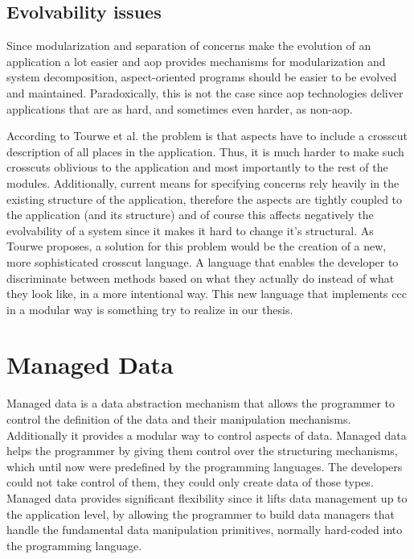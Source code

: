 \subsection{Evolvability issues}\label{Aspect Oriented Programming Evolvability}
Since modularization and separation of concerns make the evolution of an application a lot easier and \ac{aop} provides mechanisms for modularization and system decomposition, aspect-oriented programs should be easier to be evolved and maintained.
Paradoxically, this is not the case \cite{tourwe2003existence} since \ac{aop} technologies deliver applications that are as hard, and sometimes even harder, as non-\ac{aop}.

According to Tourwe et al. \cite{tourwe2003existence} the problem is that aspects have to include a crosscut description of all places in the application.
Thus, it is much harder to make such crosscuts oblivious to the application and most importantly to the rest of the modules. 
Additionally, current means for specifying concerns rely heavily in the existing structure of the application, therefore the aspects are tightly coupled to the application (and its structure) and of course this affects negatively the evolvability of a system since it makes it hard to change it's structural.
As Tourwe \cite{tourwe2003existence} proposes, a solution for this problem would be the creation of a new, more sophisticated crosscut language. 
A language that enables the developer to discriminate between methods based on what they actually do instead of what they look like, in a more intentional way.
This new language that implements \ac{ccc} in a modular way is something try to realize in our thesis.

\section{Managed Data}\label{Managed Data}
Managed data \cite{loh2012managed} is a data abstraction mechanism that allows the programmer to control the definition of the data and their manipulation mechanisms. 
Additionally it provides a modular way to control aspects of data.
Managed data helps the programmer by giving them control over the structuring mechanisms, which until now were predefined by the programming languages. 
The developers could not take control of them, they could only create data of those types.
Managed data provides significant flexibility since it lifts data management up to the application level, by allowing the programmer to build data managers that handle the fundamental data manipulation primitives, normally hard-coded into the programming language. 

